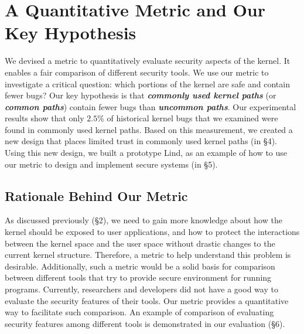 \section{A Quantitative Metric and Our Key Hypothesis}
\label{sec.metric}
We devised a metric to quantitatively evaluate security aspects of the kernel. 
It enables a fair comparison of different security tools. 
We use our metric to investigate a critical question: which portions of the kernel are safe and 
contain fewer bugs? Our key hypothesis is that \textbf{\textit{commonly used kernel paths}} (or 
\textbf{\textit{common paths}}) contain fewer bugs than \textbf{\textit{uncommon paths}}. 
Our experimental results show that only $2.5\%$ of historical kernel bugs that we examined were 
found in commonly used kernel paths. Based on this measurement, we created a new design that 
places limited trust in commonly used kernel paths (in \S{4}). Using this new design, we built a prototype 
Lind, as an example of how to use our metric to design and implement secure systems (in \S{5}). 

\subsection{Rationale Behind Our Metric}
As discussed previously (\S{2}), %
we need to gain more knowledge about how the kernel should be exposed to user applications, 
and how to protect the interactions between the kernel space and 
the user space without drastic changes to the current kernel structure. 
Therefore, a metric to help understand this problem is desirable. 
%
Additionally, such a metric would be a solid basis for comparison between different tools that try to 
provide secure environment for running programs. 
Currently, researchers and developers did not have a good way to evaluate the security features 
of their tools. 
Our metric provides a quantitative way to 
facilitate such comparison. An example of comparison of evaluating security features among different tools is 
demonstrated in our evaluation (\S{6}).

